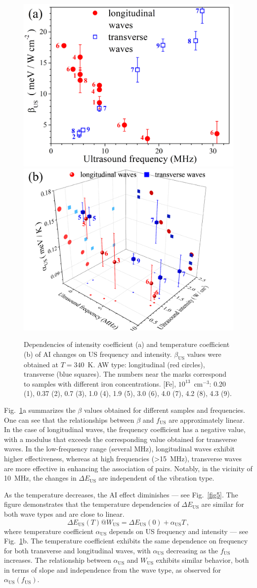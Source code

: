 \documentclass{ttp}
\begin{document}
\begin{figure}
	\centering
     \includegraphics[width=0.4\linewidth]{Fig4a.png}
     \includegraphics[width=0.4\linewidth]{Fig4b.png}
	  \caption{Dependencies of intensity coefficient (a)
       and temperature coefficient (b) of AI changes on US frequency and intensity.
       $\beta_\mathrm{US}$ values were obtained at $T=340$~K.
       AW type: longitudinal (red circles), transverse (blue squares).
       The numbers near the marks correspond to samples with different iron concentrations.
        [Fe], $10^{13}$~cm$^{-3}$: 0.20 (1), 0.37 (2), 0.7 (3), 1.0 (4), 1.9 (5),
        3.0 (6), 4.0 (7), 4.2 (8), 4.3 (9).
}\label{fig4}
\end{figure}

Fig.~\ref{fig4}a summarizes the $\beta$ values obtained for different samples and frequencies.
One can see that the relationships between $\beta$ and $f_\mathrm{US}$ are approximately linear.
In the case of longitudinal waves, the frequency coefficient has a negative value,
with a modulus that exceeds the corresponding value obtained for transverse waves.
In the low-frequency range (several MHz),
longitudinal waves exhibit higher effectiveness,
whereas at high frequencies (>15~MHz),  transverse waves are more effective
in enhancing the association of pairs.
Notably, in the vicinity of 10~MHz, the changes in $\Delta E_\mathrm{US}$ are independent of the vibration type.




As the temperature decreases, the AI effect diminishes --- see Fig.~\ref{fig5}.
The figure demonstrates that the temperature dependencies of $\Delta E_\mathrm{US}$ are similar for both wave types and are close to linear.
\begin{equation}
\label{eqEmT}
\Delta E_\mathrm{US}(T)@ W_\mathrm{US}=\Delta E_\mathrm{US}(0)+\alpha_\mathrm{US}T\,,
\end{equation}
where temperature coefficient $\alpha_\mathrm{US}$ depends on US frequency and intensity --- see Fig.~\ref{fig4}b.
The temperature coefficient exhibits the same dependence on frequency
for both transverse and longitudinal waves, with $\alpha_\mathrm{US}$ decreasing as the $f_\mathrm{US}$ increases.
The relationship between $\alpha_\mathrm{US}$ and $W_\mathrm{US}$ exhibits
similar behavior, both in terms of slope and independence from the wave type, as observed for $\alpha_\mathrm{US}(f_\mathrm{US})$.
\end{document}
